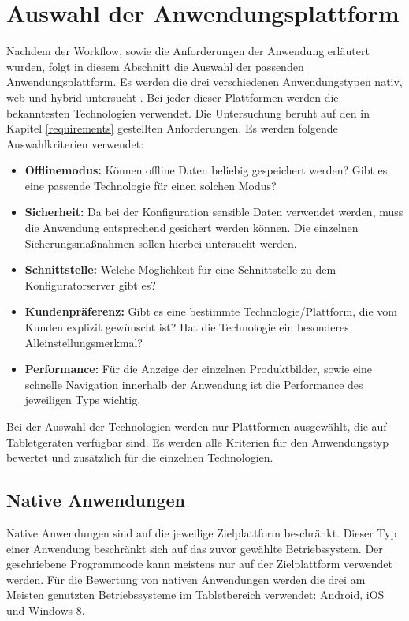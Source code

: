 \section{Auswahl der Anwendungsplattform}
Nachdem der Workflow, sowie die Anforderungen der Anwendung erläutert wurden, folgt in diesem Abschnitt die Auswahl der passenden Anwendungsplattform. Es werden die drei verschiedenen Anwendungstypen nativ, web und hybrid untersucht \cite{bib:mobilePlattform}. Bei jeder dieser Plattformen werden die bekanntesten Technologien verwendet. Die Untersuchung beruht auf den in Kapitel \ref{requirements} gestellten Anforderungen. Es werden folgende Auswahlkriterien verwendet:
\begin{itemize}
        \item \textbf{Offlinemodus:} Können offline Daten beliebig gespeichert werden? Gibt es eine passende Technologie für einen solchen Modus?
        
        \item \textbf{Sicherheit:} Da bei der Konfiguration sensible Daten verwendet werden, muss die Anwendung entsprechend gesichert werden können. Die einzelnen Sicherungsmaßnahmen sollen hierbei untersucht werden.
        
        \item \textbf{Schnittstelle:} Welche Möglichkeit für eine Schnittstelle zu dem Konfiguratorserver gibt es? 
        
        \item \textbf{Kundenpräferenz:} Gibt es eine bestimmte Technologie/Plattform, die vom Kunden explizit gewünscht ist? Hat die Technologie ein besonderes Alleinstellungsmerkmal?
        
        \item \textbf{Performance:} Für die Anzeige der einzelnen Produktbilder, sowie eine schnelle Navigation innerhalb der Anwendung ist die Performance des jeweiligen Typs wichtig.      
        
\end{itemize}
Bei der Auswahl der Technologien werden nur Plattformen ausgewählt, die auf Tabletgeräten verfügbar sind. Es werden alle Kriterien für den Anwendungstyp bewertet und zusätzlich für die einzelnen Technologien.


\subsection{Native Anwendungen}
Native Anwendungen sind auf die jeweilige Zielplattform beschränkt. Dieser Typ einer Anwendung beschränkt sich auf das zuvor gewählte Betriebssystem. Der geschriebene Programmcode kann meistens nur auf der Zielplattform verwendet werden. Für die Bewertung von nativen Anwendungen werden die drei am Meisten genutzten Betriebssysteme im Tabletbereich verwendet: Android, iOS und Windows 8\cite{bib:nativeBS}. \par

